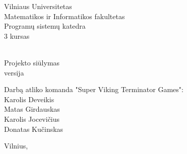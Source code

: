 \begin{titlepage}
    \begin{center}

        {\large
            Vilniaus Universitetas \\
            Matematikos ir Informatikos fakultetas \\
            Programų sistemų katedra \\
            3 kursas
        }

        \vspace{\fill}

        {\huge
        } \\[0.5cm]
        {\large
            Projekto siūlymas \\
            \versionString{} versija
        }

        \vspace{3cm}

        \begin{flushright}
            \begin{minipage}{0.4\textwidth}
                Darbą atliko komanda "Super Viking Terminator Games": \\
                Karolis Deveikis                                      \\
                Matas Girdauskas                                      \\
                Karolis Jocevičius                                    \\
                Donatas Kučinskas
            \end{minipage}
        \end{flushright}

        \vspace{\fill}

        {\large Vilnius, \the\year}

    \end{center}
\end{titlepage}
